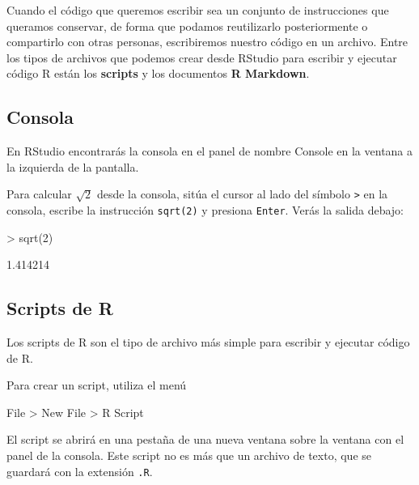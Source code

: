 \documentclass[
  title=normal,
  notoc,
  bib=normal]{mnye}
\newenvironment{Shaded}{\begin{snugshade}}{\end{snugshade}}
\newcommand{\NormalTok}[1]{#1}
\begin{document}
Cuando el código que queremos escribir sea un conjunto de instrucciones que queramos conservar, de forma que podamos reutilizarlo posteriormente o compartirlo con otras personas, escribiremos nuestro código en un archivo.
Entre los tipos de archivos que podemos crear desde \textsf{RStudio} para escribir y ejecutar código \textsf{R} están los \textbf{scripts} y los documentos \textbf{R Markdown}.

\hypertarget{consola}{%
\subsection{Consola}\label{consola}}

En \textsf{RStudio} encontrarás la consola en el panel de nombre \textsf{Console} en la ventana a la izquierda de la pantalla.

Para calcular \(\sqrt{2}\) desde la consola, sitúa el cursor al lado del símbolo \texttt{\textgreater{}} en la consola, escribe la instrucción \texttt{sqrt(2)} y presiona \texttt{Enter}. Verás la salida debajo:

\begin{Shaded}
\begin{Highlighting}[]
\NormalTok{\textgreater{} sqrt(2)}
\end{Highlighting}
\end{Shaded}

\begin{Shaded}
\begin{Highlighting}[]
\NormalTok{[1] 1.414214}
\end{Highlighting}
\end{Shaded}

\hypertarget{scripts-de-r}{%
\subsection{Scripts de R}\label{scripts-de-r}}

Los scripts de R son el tipo de archivo más simple para escribir y ejecutar código de \textsf{R}.

Para crear un script, utiliza el menú

\begin{menu}
File \textgreater{} New File \textgreater{} R Script

\end{menu}

El script se abrirá en una pestaña de una nueva ventana sobre la ventana con el panel de la consola. Este script no es más que un archivo de texto, que se guardará con la extensión \texttt{.R}.
\end{document}
